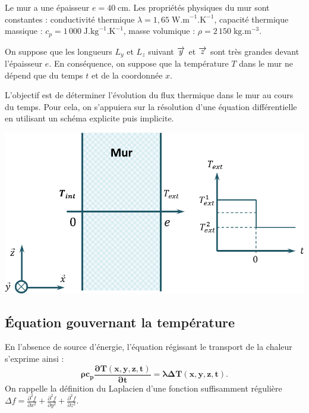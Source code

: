 \documentclass[10pt,fleqn]{article} %
\begin{document}
\begin{multicols}{2}
Le mur a une épaisseur $e=40\;\text{cm}$. Les propriétés physiques du mur sont constantes : conductivité thermique $\lambda = 1,65\; \text{W.m}^{-1}.\text{K}^{-1}$, capacité thermique massique : $c_p = 1\, 000\; \text{J}.\text{kg}^{-1}.\text{K}^{-1}$, masse volumique : $\rho = 2\, 150 \; \text{kg}.\text{m}^{-3}$. 


On suppose que les longueurs $L_y$ et $L_z$ suivant $\overrightarrow{y}$ et $\overrightarrow{z}$ sont très grandes devant l'épaisseur $e$. En conséquence, on suppose que la température $T$ dans le mur ne dépend que du temps $t$ et de la coordonnée $x$. 
\begin{obj}
L'objectif est de déterminer l'évolution du flux thermique dans le mur au cours du temps. Pour cela, on s'appuiera sur la résolution d'une équation différentielle en utilisant un schéma explicite puis implicite.
\end{obj}

\begin{center}
\includegraphics[width=\linewidth]{images/figure_01}
\end{center}





\fi
\subsection*{Équation gouvernant la température}
\ifprof
\else
En l'absence de source d'énergie, l'équation régissant le transport de la chaleur s'exprime ainsi :
\begin{equation}
\mathbf{\rho c_p \dfrac{\partial T(x,y,z,t)}{\partial t} =  \lambda  \Delta T(x,y,z,t)}.
\end{equation}
On rappelle la définition du Laplacien d'une fonction suffisamment régulière 
$\Delta f =\frac{\partial^2 f}{\partial x^2}+\frac{\partial^2 f}{\partial y^2}
+\frac{\partial^2 f}{\partial z^2}$.
\fi


\end{multicols}
\end{document}
